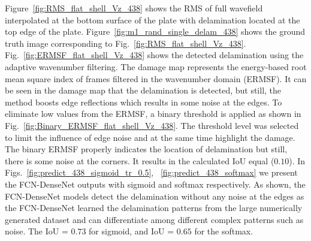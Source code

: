 Figure~\ref{fig:RMS_flat_shell_Vz_438} shows the RMS of full wavefield interpolated at the bottom surface of the plate with delamination located at the top edge of the plate.
Figure~\ref{fig:m1_rand_single_delam_438} shows the ground truth image corresponding to Fig.~\ref{fig:RMS_flat_shell_Vz_438}. 
Fig.~\ref{fig:ERMSF_flat_shell_Vz_438} shows the detected delamination using the adaptive wavenumber filtering. 
The damage map represents the energy-based root mean square index of frames filtered in the wavenumber domain (ERMSF). 
It can be seen in the damage map that the delamination is detected, but still, the method boosts edge reflections which results in some noise at the edges. 
To eliminate low values from the ERMSF, a binary threshold is applied as shown in Fig.~\ref{fig:Binary_ERMSF_flat_shell_Vz_438}.
The threshold level was selected to limit the influence of edge noise and at the same time highlight the damage. 
The binary ERMSF properly indicates the location of delamination but still, there is some noise at the corners.
It results in the calculated IoU equal (\(0.10\)).
In Figs.~\ref{fig:predict_438_sigmoid_tr_0.5}, ~\ref{fig:predict_438_softmax} we present the FCN-DenseNet outputs with sigmoid and softmax respectively.
As shown, the FCN-DenseNet models detect the delamination without any noise at the edges as the FCN-DenseNet learned the delamination patterns from the large numerically generated dataset and can differentiate among different complex patterns such as noise.   
The IoU = \(0.73\) for sigmoid, and IoU = \(0.65\) for the softmax.
